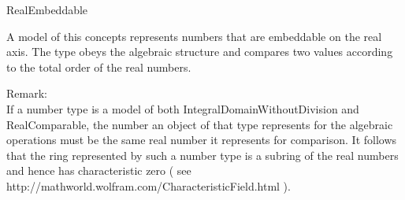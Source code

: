 \begin{ccRefConcept}{RealEmbeddable}

\ccDefinition

A model of this concepts represents numbers that are embeddable on the real 
axis. The type obeys the algebraic structure and compares two values according 
to the total order of the real numbers.


Remark:\\
If a number type is a model of both IntegralDomainWithoutDivision and 
RealComparable, the number an object of that type represents for the 
algebraic operations must be the same real number it represents for 
comparison. It follows that the ring represented by such a number type 
is a subring of the real numbers and hence has characteristic zero 
( see http://mathworld.wolfram.com/CharacteristicField.html ).

\ccRefines
{}

\ccOperations
{}
\ccGlue
{}
\ccGlue
{}
\ccGlue
{}
\ccGlue



\ccSeeAlso

\\

\ccHasModels

\end{ccRefConcept}